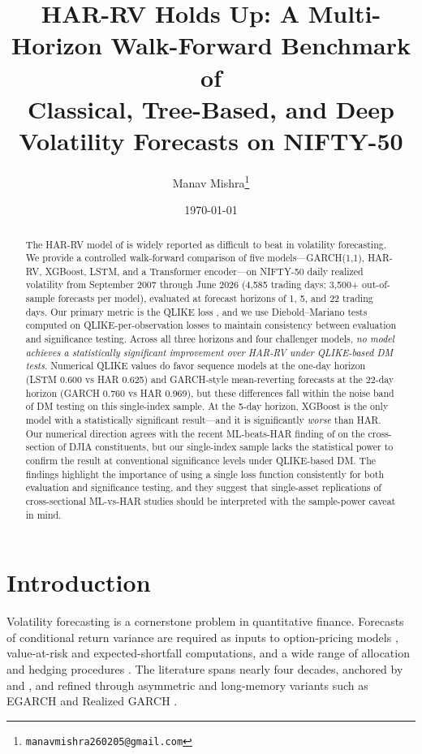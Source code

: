 \documentclass[11pt]{article}
\title{\bf HAR-RV Holds Up: A Multi-Horizon Walk-Forward Benchmark of \\
Classical, Tree-Based, and Deep Volatility Forecasts on NIFTY-50}
\author[1]{Manav Mishra\thanks{\texttt{manavmishra260205@gmail.com}}}
\affil[1]{Vellore Institute of Technology, Vellore, India}
\date{\today}
\begin{document}
\maketitle

\begin{abstract}
The HAR-RV model of \citet{corsi2009} is widely reported as
difficult to beat in volatility forecasting. We provide a controlled
walk-forward comparison of five models---GARCH(1,1), HAR-RV, XGBoost,
LSTM, and a Transformer encoder---on NIFTY-50 daily realized
volatility from September 2007 through June 2026 (4{,}585 trading
days; 3{,}500+ out-of-sample forecasts per model), evaluated at
forecast horizons of 1, 5, and 22 trading days. Our primary metric is
the QLIKE loss \citep{patton2011}, and we use Diebold--Mariano tests
\citep{dieboldmariano1995} computed on QLIKE-per-observation losses
to maintain consistency between evaluation and significance testing.
Across all three horizons and four challenger models, \emph{no model
achieves a statistically significant improvement over HAR-RV under
QLIKE-based DM tests}. Numerical QLIKE values do favor sequence
models at the one-day horizon (LSTM 0.600 vs HAR 0.625) and
GARCH-style mean-reverting forecasts at the 22-day horizon (GARCH
0.760 vs HAR 0.969), but these differences fall within the noise
band of DM testing on this single-index sample. At the 5-day
horizon, XGBoost is the only model with a statistically significant
result---and it is significantly \emph{worse} than HAR. Our
numerical direction agrees with the recent ML-beats-HAR finding of
\citet{christensen2023machine} on the cross-section of DJIA
constituents, but our single-index sample lacks the statistical
power to confirm the result at conventional significance levels
under QLIKE-based DM. The findings highlight the importance of
using a single loss function consistently for both evaluation and
significance testing, and they suggest that single-asset replications
of cross-sectional ML-vs-HAR studies should be interpreted with the
sample-power caveat in mind.
\end{abstract}

\section{Introduction}
\label{sec:intro}

Volatility forecasting is a cornerstone problem in quantitative
finance. Forecasts of conditional return variance are required as
inputs to option-pricing models \citep{black1973pricing},
value-at-risk and expected-shortfall computations, and a wide range
of allocation and hedging procedures \citep{andersen2006volatility}.
The literature spans nearly four decades, anchored by
\citet{engle1982arch} and \citet{bollerslev1986garch}, and refined
through asymmetric and long-memory variants such as EGARCH
\citep{nelson1991egarch} and Realized GARCH
\citep{hansen2012realized}.
\end{document}

